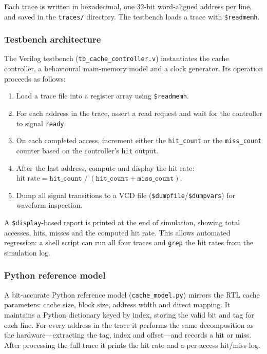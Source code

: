 Each trace is written in hexadecimal, one 32-bit word-aligned address per
line, and saved in the \texttt{traces/} directory.  The testbench loads a
trace with \texttt{\$readmemh}.

\subsubsection{Testbench architecture}
The Verilog testbench (\texttt{tb\_cache\_controller.v}) instantiates the
cache controller, a behavioural main-memory model and a clock generator.
Its operation proceeds as follows:
\begin{enumerate}
  \item Load a trace file into a register array using \texttt{\$readmemh}.
  \item For each address in the trace, assert a read request and wait for
        the controller to signal \texttt{ready}.
  \item On each completed access, increment either the
        \texttt{hit\_count} or the \texttt{miss\_count} counter based on
        the controller's \texttt{hit} output.
  \item After the last address, compute and display the hit rate:
        $\text{hit rate} = \texttt{hit\_count} \;/\;
        (\texttt{hit\_count} + \texttt{miss\_count})$.
  \item Dump all signal transitions to a VCD file
        (\texttt{\$dumpfile}/\texttt{\$dumpvars}) for waveform inspection.
\end{enumerate}

A \texttt{\$display}-based report is printed at the end of simulation,
showing total accesses, hits, misses and the computed hit rate.  This
allows automated regression: a shell script can run all four traces and
\texttt{grep} the hit rates from the simulation log.

\subsubsection{Python reference model}
A bit-accurate Python reference model (\texttt{cache\_model.py}) mirrors
the RTL cache parameters: cache size, block size, address width and direct
mapping.  It maintains a Python dictionary keyed by index, storing the
valid bit and tag for each line.  For every address in the trace it
performs the same decomposition as the hardware---extracting the tag, index
and offset---and records a hit or miss.  After processing the full trace
it prints the hit rate and a per-access hit/miss log.


